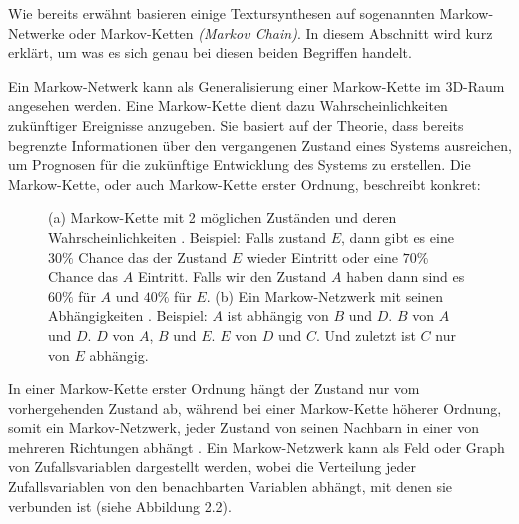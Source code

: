 \documentclass[12pt, a4paper,twoside,openright]{report} %
\begin{document}
Wie bereits erwähnt basieren einige Textursynthesen auf sogenannten Markow-Netwerke oder Markov-Ketten \textit{(Markov Chain)}.
In diesem Abschnitt wird kurz erklärt, um was es sich genau bei diesen beiden Begriffen handelt.\par
Ein Markow-Netwerk kann als Generalisierung einer Markow-Kette im 3D-Raum angesehen werden.
Eine Markow-Kette dient dazu Wahrscheinlichkeiten zukünftiger Ereignisse anzugeben.
Sie basiert auf der Theorie, dass bereits begrenzte Informationen über den vergangenen Zustand eines Systems ausreichen,
um Prognosen für die zukünftige Entwicklung des Systems zu erstellen.
Die Markow-Kette, oder auch Markow-Kette erster Ordnung, beschreibt konkret:
 \cite{wiki:Markow-Kette}

\begin{figure}[H]
    \centering
    \qquad
    \caption{(a) Markow-Kette mit 2 möglichen Zuständen und deren Wahrscheinlichkeiten \cite{wiki:Markow-Kette}.
    Beispiel: Falls zustand $E$, dann gibt es eine $30\%$ Chance das der Zustand $E$ wieder Eintritt oder eine $70\%$ Chance das $A$ Eintritt.
    Falls wir den Zustand $A$ haben dann sind es $60\%$ für $A$ und $40\%$ für $E$. (b) Ein Markow-Netzwerk mit seinen Abhängigkeiten \cite{wiki:Markov_model}.
    Beispiel: $A$ ist abhängig von $B$ und $D$. $B$ von $A$ und $D$. $D$ von $A$, $B$ und $E$. $E$ von $D$ und $C$. Und zuletzt ist $C$ nur von $E$ abhängig.}%
\end{figure}

In einer Markow-Kette erster Ordnung hängt der Zustand nur vom vorhergehenden Zustand ab,
während bei einer Markow-Kette höherer Ordnung, somit ein Markov-Netzwerk, jeder Zustand von seinen Nachbarn in einer von mehreren Richtungen abhängt \cite{wiki:Markov_model}.
Ein Markow-Netzwerk kann als Feld oder Graph von Zufallsvariablen dargestellt werden,
wobei die Verteilung jeder Zufallsvariablen von den benachbarten Variablen abhängt, mit denen sie verbunden ist {(siehe Abbildung 2.2)}.
\end{document}
